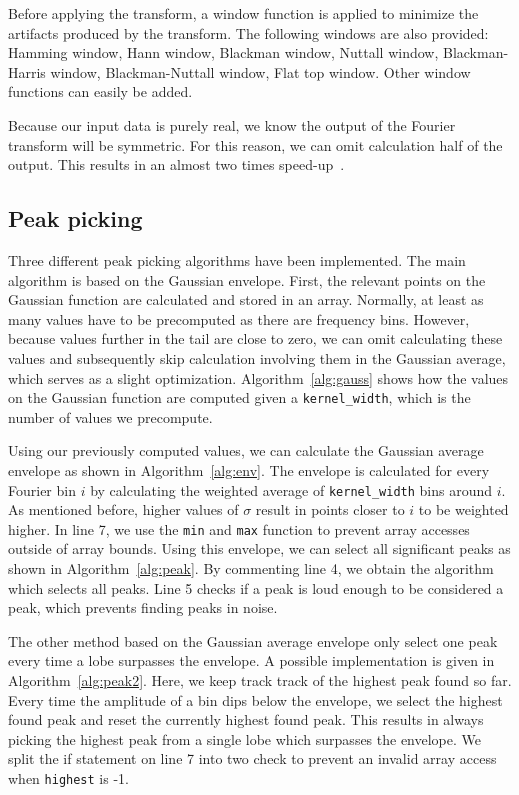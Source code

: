 \documentclass[10pt,twocolumn]{article}
\begin{document}
Before applying the transform, a window function is applied to minimize the artifacts produced by the transform. The following windows are also provided: Hamming window, Hann window, Blackman window, Nuttall window, Blackman-Harris window, Blackman-Nuttall window, Flat top window. Other window functions can easily be added.

Because our input data is purely real, we know the output of the Fourier transform will be symmetric. For this reason, we can omit calculation half of the output. This results in an almost two times speed-up~\cite{twotimes}.

\subsection{Peak picking} \label{sub:peak}
Three different peak picking algorithms have been implemented. The main algorithm is based on the Gaussian envelope. First, the relevant points on the Gaussian function are calculated and stored in an array. Normally, at least as many values have to be precomputed as there are frequency bins. However, because values further in the tail are close to zero, we can omit calculating these values and subsequently skip calculation involving them in the Gaussian average, which serves as a slight optimization. Algorithm~\ref{alg:gauss} shows how the values on the Gaussian function are computed given a \texttt{kernel\_width}, which is the number of values we precompute.


Using our previously computed values, we can calculate the Gaussian average envelope as shown in Algorithm~\ref{alg:env}. The envelope is calculated for every Fourier bin $i$ by calculating the weighted average of \texttt{kernel\_width} bins around $i$. As mentioned before, higher values of $\sigma$ result in points closer to $i$ to be weighted higher. In line 7, we use the \texttt{min} and \texttt{max} function to prevent array accesses outside of array bounds. Using this envelope, we can select all significant peaks as shown in Algorithm~\ref{alg:peak}. By commenting line 4, we obtain the algorithm which selects all peaks. Line 5 checks if a peak is loud enough to be considered a peak, which prevents finding peaks in noise.

The other method based on the Gaussian average envelope only select one peak every time a lobe surpasses the envelope. A possible implementation is given in Algorithm~\ref{alg:peak2}. Here, we keep track track of the highest peak found so far. Every time the amplitude of a bin dips below the envelope, we select the highest found peak and reset the currently highest found peak. This results in always picking the highest peak from a single lobe which surpasses the envelope. We split the if statement on line 7 into two check to prevent an invalid array access when \texttt{highest} is -1.



\end{document}

